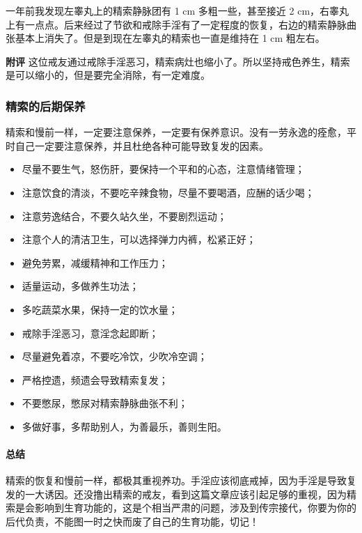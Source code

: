 \begin{case}[精索静脉曲张]
    一年前我发现左睾丸上的精索静脉团有 1 \unit{\cm} 多粗一些，甚至接近 2 \unit{\cm}，右睾丸上有一点点。后来经过了节欲和戒除手淫有了一定程度的恢复，右边的精索静脉曲张基本上消失了。但是到现在左睾丸的精索也一直是维持在 1 \unit{\cm} 粗左右。

    \textbf{附评} 这位戒友通过戒除手淫恶习，精索病灶也缩小了。所以坚持戒色养生，精索是可以缩小的，但是要完全消除，有一定难度。
\end{case}

\subsubsection{精索的后期保养}

精索和慢前一样，一定要注意保养，一定要有保养意识。没有一劳永逸的痊愈，平时自己一定要注意保养，并且杜绝各种可能导致复发的因素。

\begin{itemize}
    \item 尽量不要生气，怒伤肝，要保持一个平和的心态，注意情绪管理；
    \item 注意饮食的清淡，不要吃辛辣食物，尽量不要喝酒，应酬的话少喝；
    \item 注意劳逸结合，不要久站久坐，不要剧烈运动；
    \item 注意个人的清洁卫生，可以选择弹力内裤，松紧正好；
    \item 避免劳累，减缓精神和工作压力；
    \item 适量运动，多做养生功法；
    \item 多吃蔬菜水果，保持一定的饮水量；
    \item 戒除手淫恶习，意淫念起即断；
    \item 尽量避免着凉，不要吃冷饮，少吹冷空调；
    \item 严格控遗，频遗会导致精索复发；
    \item 不要憋尿，憋尿对精索静脉曲张不利；
    \item 多做好事，多帮助别人，为善最乐，善则生阳。
\end{itemize}

\paragraph*{总结}

精索的恢复和慢前一样，都极其重视养功。手淫应该彻底戒掉，因为手淫是导致复发的一大诱因。还没撸出精索的戒友，看到这篇文章应该引起足够的重视，因为精索是会影响到生育功能的，这是个相当严肃的问题，涉及到传宗接代，你要为你的后代负责，不能图一时之快而废了自己的生育功能，切记！

